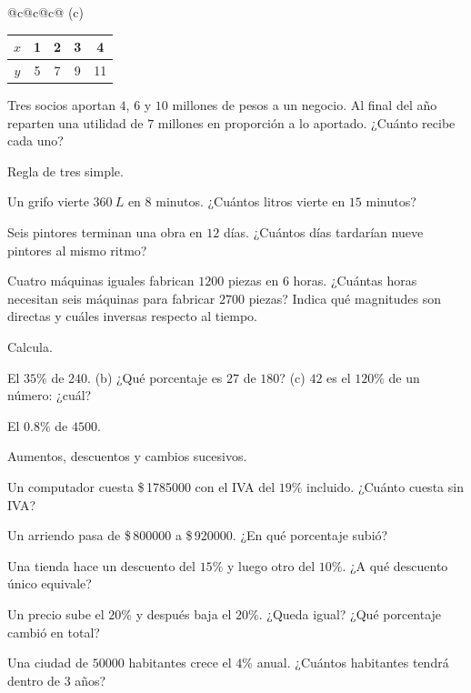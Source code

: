 \documentclass[11pt,a4paper]{article}
\newcommand{\pesos}[1]{\$\,\num{#1}}
\begin{document}
\begin{ejercicios}
\begin{center}
\begin{tabular}{@{}c@{\hspace{10mm}}c@{\hspace{10mm}}c@{}}
  (c)\ \begin{tabular}{c|cccc} $x$ & 1 & 2 & 3 & 4\\ \hline $y$ & 5 & 7 & 9 & 11\end{tabular}
  \end{tabular}
  \end{center}
\item Tres socios aportan $4$, $6$ y $10$ millones de pesos a un negocio. Al final del año reparten una utilidad de
  $7$ millones en proporción a lo aportado. ¿Cuánto recibe cada uno?
\item Regla de tres simple.
  \begin{ejercicios}
  \item Un grifo vierte $\SI{360}{L}$ en $8$ minutos. ¿Cuántos litros vierte en $15$ minutos?
  \item Seis pintores terminan una obra en $12$ días. ¿Cuántos días tardarían nueve pintores al mismo ritmo?
  \end{ejercicios}
\item Cuatro máquinas iguales fabrican $\num{1200}$ piezas en $6$ horas. ¿Cuántas horas necesitan seis máquinas para
  fabricar $\num{2700}$ piezas? Indica qué magnitudes son directas y cuáles inversas respecto al tiempo.
\item Calcula.
  \begin{ejercicios}
  \item El $35\%$ de $240$. \quad (b) ¿Qué porcentaje es $27$ de $180$? \quad (c) $42$ es el $120\%$ de un número: ¿cuál?
  \item El $0.8\%$ de $\num{4500}$.
  \end{ejercicios}
\item Aumentos, descuentos y cambios sucesivos.
  \begin{ejercicios}
  \item Un computador cuesta \pesos{1785000} con el IVA del $19\%$ incluido. ¿Cuánto cuesta sin IVA?
  \item Un arriendo pasa de \pesos{800000} a \pesos{920000}. ¿En qué porcentaje subió?
  \item Una tienda hace un descuento del $15\%$ y luego otro del $10\%$. ¿A qué descuento único equivale?
  \item Un precio sube el $20\%$ y después baja el $20\%$. ¿Queda igual? ¿Qué porcentaje cambió en total?
  \item Una ciudad de $\num{50000}$ habitantes crece el $4\%$ anual. ¿Cuántos habitantes tendrá dentro de $3$ años?
  \end{ejercicios}
\end{ejercicios}
\end{document}
